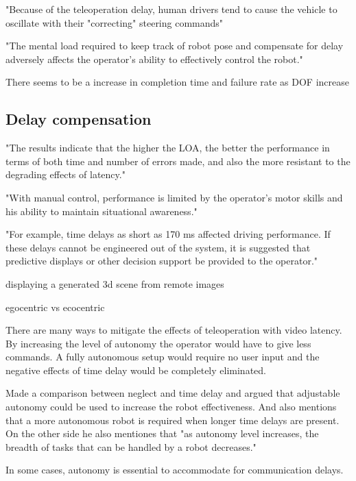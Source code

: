 \citep{Appelqvist2007} "Because of the teleoperation delay, human drivers
tend to cause the vehicle to oscillate with their "correcting" steering commands" 

\citep{Ricks2004} "The mental load required to keep track of robot pose and compensate for delay adversely affects the operator's ability to effectively control the robot."

There seems to be a increase in completion time and failure rate as DOF increase


\subsection{Delay compensation}

\citep{Luck2006} "The results indicate that the higher the LOA, the better the performance in terms of both time and number of errors made, and also the more resistant to the degrading effects of latency."

\citep{Fong2001} "With manual control, performance is limited by the operator's motor skills and his ability to maintain situational awareness."

\citep{Chen2007} "For example, time delays as short as 170 ms affected driving performance. If these delays cannot be engineered out of the system, it is suggested that predictive displays or other decision support be provided to the operator."

displaying a generated 3d scene from remote images

egocentric vs ecocentric

There are many ways to mitigate the effects of teleoperation with video latency. By increasing the level of autonomy the operator would have to give less commands. A fully autonomous setup would require no user input and the negative effects of time delay would be completely eliminated.

\citep{Goodrich2001} Made a comparison between neglect and time delay and argued that adjustable autonomy could be used to increase the robot effectiveness. And also mentions that a more autonomous robot is required when longer time delays are present. On the other side he also mentiones that "as autonomy level increases, the breadth of tasks that can be handled by a robot decreases."

In some cases, autonomy is essential to accommodate for communication delays. \citep{Dorais1999}

